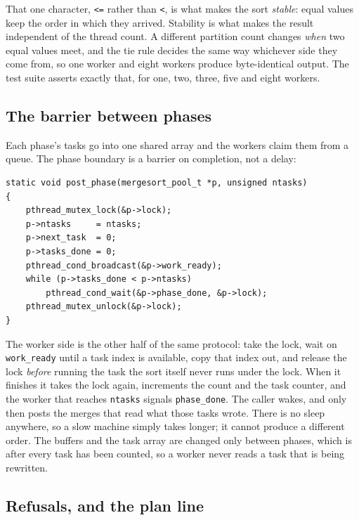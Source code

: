 \documentclass[12pt,a4paper,oneside]{report}
\begin{document}
That one character, \texttt{<=} rather than \texttt{<}, is what makes the sort
\emph{stable}: equal values keep the order in which they arrived. Stability is
what makes the result independent of the thread count. A different partition
count changes \emph{when} two equal values meet, and the tie rule decides the
same way whichever side they come from, so one worker and eight workers produce
byte-identical output. The test suite asserts exactly that, for one, two, three,
five and eight workers.

\subsection{The barrier between phases}

Each phase's tasks go into one shared array and the workers claim them from a
queue. The phase boundary is a barrier on completion, not a delay:

\noindent\begin{minipage}{\linewidth}
\begin{lstlisting}[caption={\texttt{post\_phase()}: publish a round's tasks, then
block until every one of them has been counted as done.}, label={lst:post-phase},
basicstyle=\ttfamily\footnotesize]
static void post_phase(mergesort_pool_t *p, unsigned ntasks)
{
    pthread_mutex_lock(&p->lock);
    p->ntasks     = ntasks;
    p->next_task  = 0;
    p->tasks_done = 0;
    pthread_cond_broadcast(&p->work_ready);
    while (p->tasks_done < p->ntasks)
        pthread_cond_wait(&p->phase_done, &p->lock);
    pthread_mutex_unlock(&p->lock);
}
\end{lstlisting}
\end{minipage}

The worker side is the other half of the same protocol: take the lock, wait on
\texttt{work\_ready} until a task index is available, copy that index out, and
release the lock \emph{before} running the task  the sort itself never runs
under the lock. When it finishes it takes the lock again, increments the count and
the task counter, and the worker that reaches \texttt{ntasks} signals
\texttt{phase\_done}. The caller wakes, and only then posts the merges that read
what those tasks wrote. There is no sleep anywhere, so a slow machine simply takes
longer; it cannot produce a different order. The buffers and the task array are
changed only between phases, which is after every task has been counted, so a
worker never reads a task that is being rewritten.

\subsection{Refusals, and the plan line}
\end{document}
